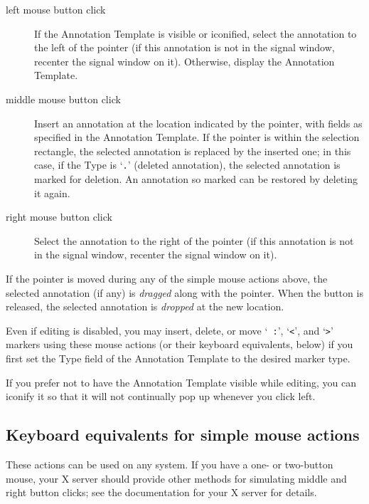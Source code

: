 \documentclass[twoside]{book}
\begin{document}
\begin{description}
\item[left mouse button click]
If the {\sf Annotation Template} is visible or iconified, select the
annotation to the left of the pointer (if this annotation is not in
the signal window, recenter the signal window on it).  Otherwise,
display the {\sf Annotation Template}.

\item[middle mouse button click]
Insert an annotation at the location indicated by the pointer, with fields as
specified in the {\sf Annotation Template}.  If the pointer is within
the selection rectangle, the selected annotation is replaced by the
inserted one;  in this case, if the {\sf Type} is `{\tt .}' (deleted
annotation), the selected annotation is marked for deletion.  An
annotation so marked can be restored by deleting it again.

\item[right mouse button click]
Select the annotation to the right of the pointer (if this annotation
is not in the signal window, recenter the signal window on it).
\end{description}

If the pointer is moved during any of the simple mouse actions above, the
selected annotation (if any) is \emph{dragged} along with the pointer.
When the button is released, the selected annotation is \emph{dropped}
at the new location.

Even if editing is disabled, you may insert, delete, or move `{\tt
:}', `{\tt <}', and `{\tt >}' markers using these mouse actions (or
their keyboard equivalents, below) if you first set the {\sf Type}
field of the {\sf Annotation Template} to the desired marker type.

If you prefer not to have the {\sf Annotation Template} visible while
editing, you can iconify it so that it will not continually pop up
whenever you click left.

\subsection*{Keyboard equivalents for simple mouse actions}

These actions can be used on any system.  If you have a one- or
two-button mouse, your X server should provide other methods for
simulating middle and right button clicks;  see the documentation for
your X server for details.
\end{document}
